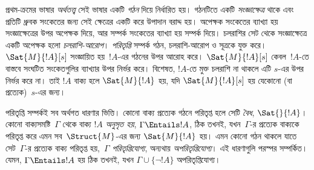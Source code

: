 প্রথম-ক্রমের ভাষার \emph{অর্থতত্ত্ব} সেই ভাষার একটি \emph{গঠন}
দিয়ে নির্ধারিত হয়। গঠনটিতে একটি \emph{সংজ্ঞাক্ষেত্র} থাকে এবং
প্রতিটি ধ্রুবক সংকেতের জন্য সেই ক্ষেত্রের একটি করে উপাদান বরাদ্দ
হয়। অপেক্ষক সংকেতের ব্যাখ্যা হয় সংজ্ঞাক্ষেত্রের উপর অপেক্ষক
দিয়ে, আর সম্পর্ক সংকেতের ব্যাখ্যা হয় সম্পর্ক দিয়ে। চলরাশির
সেট থেকে সংজ্ঞাক্ষেত্রে একটি অপেক্ষক হলো \emph{চলরাশি-আরোপ}।
\emph{পরিতৃপ্তি} সম্পর্ক গঠন, চলরাশি-আরোপ ও সূত্রকে যুক্ত করে।
$\Sat{M}{!A}[s]$ সংজ্ঞায়িত হয়~$!A$-এর গঠনের উপর আরোহ করে।
$\Sat{M}{!A}[s]$ কেবল~$!A$-তে বাস্তবে সংঘটিত সংকেতগুলির
ব্যাখ্যার উপর নির্ভর করে। বিশেষত, $!A$-তে মুক্ত চলরাশি না থাকলে
এটি $s$-এর উপর নির্ভর করে না। তাই $!A$ বাক্য হলে
$\Sat{M}{!A}$ হয়, যদি $\Sat{M}{!A}[s]$ হয় যেকোনো (বা প্রত্যেক)~$s$-এর জন্য।

পরিতৃপ্তি সম্পর্কই সব অর্থগত ধারণার ভিত্তি। কোনো বাক্য প্রত্যেক
গঠনে পরিতৃপ্ত হলে সেটি \emph{বৈধ}, $\Sat{{}}{!A}$। কোনো
বাক্যসমষ্টি~$\Gamma$ থেকে বাক্য $!A$ \emph{অনুসৃত হয়},
$\Gamma \Entails !A$, ঠিক তখনই, যখন~$\Gamma$-র প্রত্যেক বাক্যকে
পরিতৃপ্ত করে এমন সব~$\Struct{M}$-এর জন্য $\Sat{M}{!A}$ হয়।
এমন কোনো গঠন থাকলে যাতে সেট~$\Gamma$-র প্রত্যেক বাক্য পরিতৃপ্ত
হয়,~$\Gamma$ \emph{পরিতৃপ্তিযোগ্য}, অন্যথায়
\emph{অপরিতৃপ্তিযোগ্য}। এই ধারণাগুলি পরস্পর সম্পর্কিত। যেমন,
$\Gamma \Entails !A$ হয় ঠিক তখনই, যখন $\Gamma \cup \{\lnot
!A\}$ অপরিতৃপ্তিযোগ্য।
